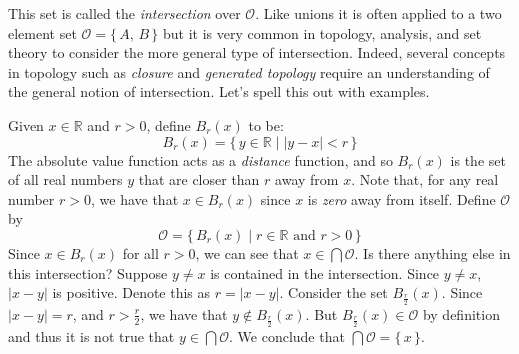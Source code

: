             This set is called the \textit{intersection} over $\mathcal{O}$.
            Like unions it is often applied to a two element set
            $\mathcal{O}=\{\,A,\,B\,\}$ but it is very common in topology,
            analysis, and set theory to consider the more general type of
            intersection. Indeed, several concepts in topology such as
            \textit{closure} and \textit{generated topology} require an
            understanding of the general notion of intersection. Let's spell
            this out with examples.
            \begin{example}
                Given $x\in\mathbb{R}$ and $r>0$, define $B_{r}(x)$ to
                be:
                \begin{equation}
                    B_{r}(x)=\{\,y\in\mathbb{R}\;|\;|y-x|<r\,\}
                \end{equation}
                The absolute value function acts as a
                \textit{distance} function, and so $B_{r}(x)$ is the set of
                all real numbers $y$ that are closer than $r$ away from $x$.
                Note that, for any real number $r>0$, we have that
                $x\in{B}_{r}(x)$ since $x$ is \textit{zero} away from itself.
                Define $\mathcal{O}$ by
                \begin{equation}
                    \mathcal{O}=\{\,B_{r}(x)\;|\;r\in\mathbb{R}\textrm{ and }
                        r>0\,\}
                \end{equation}
                Since $x\in{B}_{r}(x)$ for all $r>0$, we can see that
                $x\in\bigcap\mathcal{O}$. Is there anything else in this
                intersection? Suppose $y\ne{x}$ is contained in the
                intersection. Since $y\ne{x}$, $|x-y|$ is positive. Denote this
                as $r=|x-y|$. Consider the set $B_{\frac{r}{2}}(x)$. Since
                $|x-y|=r$, and $r>\frac{r}{2}$, we have that
                $y\notin{B}_{\frac{r}{2}}(x)$. But
                $B_{\frac{r}{2}}(x)\in\mathcal{O}$ by definition and thus it
                is not true that $y\in\bigcap\mathcal{O}$. We conclude that
                $\bigcap\mathcal{O}=\{\,x\,\}$.
            \end{example}
